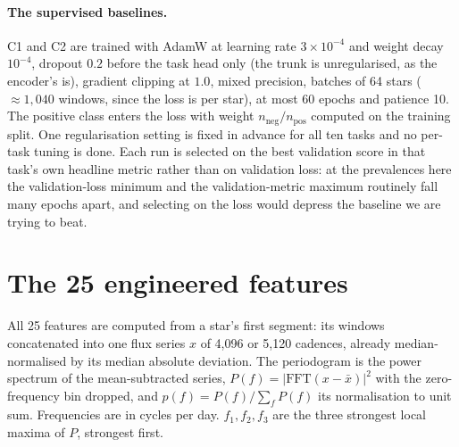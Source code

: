 \documentclass{article}
\begin{document}
\paragraph{The supervised baselines.} C1 and C2 are trained with AdamW at learning rate
$3\times10^{-4}$ and weight decay $10^{-4}$, dropout $0.2$ before the task head only (the trunk is
unregularised, as the encoder's is), gradient clipping at $1.0$, mixed precision, batches of 64
stars ($\approx 1{,}040$ windows, since the loss is per star), at most 60 epochs and patience 10.
The positive class enters the loss with weight $n_{\mathrm{neg}}/n_{\mathrm{pos}}$ computed on the
training split. One regularisation setting is fixed in advance for all ten tasks and no per-task
tuning is done. Each run is selected on the best validation score in that task's own headline metric
rather than on validation loss: at the prevalences here the validation-loss minimum and the
validation-metric maximum routinely fall many epochs apart, and selecting on the loss would depress
the baseline we are trying to beat.

\section{The 25 engineered features}
\label{app:features}

All 25 features are computed from a star's first segment: its windows concatenated into one flux
series $x$ of 4{,}096 or 5{,}120 cadences, already median-normalised by its median absolute
deviation. The periodogram is the power spectrum of the mean-subtracted series,
$P(f) = |\mathrm{FFT}(x - \bar{x})|^{2}$ with the zero-frequency bin dropped, and
$p(f) = P(f)/\sum_f P(f)$ its normalisation to unit sum. Frequencies are in cycles per day.
$f_{1}, f_{2}, f_{3}$ are the three strongest local maxima of $P$, strongest first.
\end{document}
